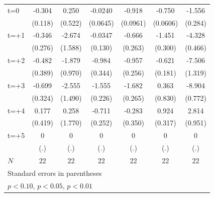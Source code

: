 \begin{table}[htbp]
\begin{tabular}{l*{6}{c}}
\addlinespace
t=0         &      -0.304         &       0.250         &     -0.0240         &      -0.918\sym{**} &      -0.750\sym{***}&      -1.556\sym{**} \\
            &     (0.118)         &     (0.522)         &    (0.0645)         &    (0.0961)         &    (0.0606)         &     (0.284)         \\
\addlinespace
t=+1        &      -0.346         &      -2.674         &     -0.0347         &      -0.666         &      -1.451\sym{**} &      -4.328\sym{**} \\
            &     (0.276)         &     (1.588)         &     (0.130)         &     (0.263)         &     (0.300)         &     (0.466)         \\
\addlinespace
t=+2        &      -0.482         &      -1.879         &      -0.984         &      -0.957\sym{*}  &      -0.621\sym{*}  &      -7.506\sym{**} \\
            &     (0.389)         &     (0.970)         &     (0.344)         &     (0.256)         &     (0.181)         &     (1.319)         \\
\addlinespace
t=+3        &      -0.699         &      -2.555         &      -1.555\sym{**} &      -1.682\sym{**} &       0.363         &      -8.904\sym{***}\\
            &     (0.324)         &     (1.490)         &     (0.226)         &     (0.265)         &     (0.830)         &     (0.772)         \\
\addlinespace
t=+4        &       0.177         &       0.258         &      -0.711         &      -0.283         &       0.924         &       2.814\sym{*}  \\
            &     (0.419)         &     (1.770)         &     (0.252)         &     (0.350)         &     (0.317)         &     (0.951)         \\
\addlinespace
t=+5        &           0         &           0         &           0         &           0         &           0         &           0         \\
            &         (.)         &         (.)         &         (.)         &         (.)         &         (.)         &         (.)         \\
\midrule
\(N\)       &          22         &          22         &          22         &          22         &          22         &          22         \\
\bottomrule
\multicolumn{7}{l}{\footnotesize Standard errors in parentheses}\\
\multicolumn{7}{l}{\footnotesize \sym{*} \(p<0.10\), \sym{**} \(p<0.05\), \sym{***} \(p<0.01\)}\\
\end{tabular}
\end{table}
